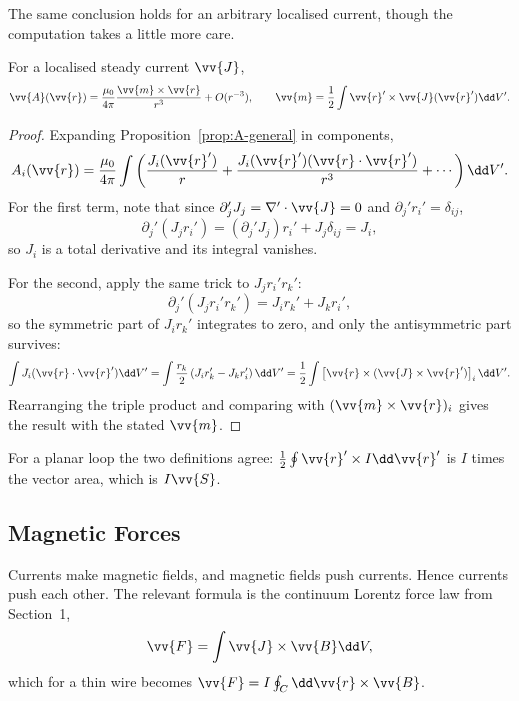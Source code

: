 The same conclusion holds for an arbitrary localised current, though the computation takes a little more care.

\begin{proposition}
	For a localised steady current $\vv{J}$,
	$$
	\vv{A}(\vv{r}) = \frac{\mu_0}{4\pi}\frac{\vv{m}\times \vv{r}}{r^3} + O(r^{-3}), \qquad \vv{m} = \frac{1}{2}\int \vv{r}'\times \vv{J}(\vv{r}')\dd V'.
	$$
\end{proposition}
\begin{proof}
	Expanding Proposition~\ref{prop:A-general} in components,
	$$
	A_i(\vv{r}) = \frac{\mu_0}{4\pi}\int\left(\frac{J_i(\vv{r}')}{r} + \frac{J_i(\vv{r}')(\vv{r}\cdot \vv{r}')}{r^3}+\cdots\right)\dd V'.
	$$
	For the first term, note that since $\partial_j' J_j = \nabla'\cdot \vv{J} = 0$ and $\partial_j' r_i' = \delta_{ij}$,
	$$
	\partial_j'(J_j r_i') = (\partial_j'J_j)r_i' + J_j \delta_{ij} = J_i,
	$$
	so $J_i$ is a total derivative and its integral vanishes.

	For the second, apply the same trick to $J_j r_i'r_k'$:
	$$
	\partial_j'(J_j r_i' r_k') = J_i r_k' + J_k r_i',
	$$
	so the symmetric part of $J_ir_k'$ integrates to zero, and only the antisymmetric part survives:
	$$
	\int J_i (\vv{r}\cdot\vv{r}')\dd V' = \int \frac{r_k}{2}\left(J_ir_k' - J_kr_i'\right)\dd V' = \frac{1}{2}\int \left[\vv{r}\times(\vv{J}\times\vv{r}')\right]_i \dd V'.
	$$
	Rearranging the triple product and comparing with $(\vv{m}\times \vv{r})_i$ gives the result with the stated $\vv{m}$.
\end{proof}

For a planar loop the two definitions agree: $\frac{1}{2}\oint \vv{r}'\times I\dd \vv{r}'$ is $I$ times the vector area, which is $I\vv{S}$.

\subsection{Magnetic Forces}

Currents make magnetic fields, and magnetic fields push currents. Hence currents push each other. The relevant formula is the continuum Lorentz force law from Section~1,
$$
\vv{F} = \int \vv{J}\times \vv{B}\dd V,
$$
which for a thin wire becomes $\vv{F} = I\oint_C \dd \vv{r}\times \vv{B}$.

